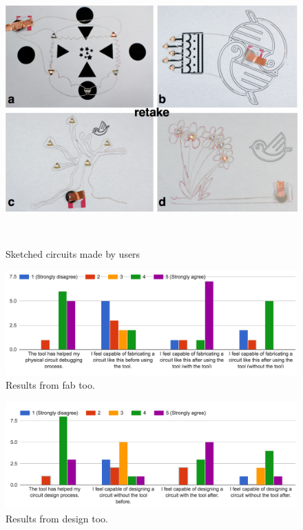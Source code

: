 \documentclass{sigchi}
\begin{document}
\begin{figure}
\centering
  \includegraphics[width=1\columnwidth]{figures/Users_artwork}
  \caption{Sketched circuits made by users}~\label{fig:user-artwork}
\end{figure}




\begin{figure}[t]
\centering
\includegraphics[width=1.0\columnwidth]{figures/fab_tool_results.png}
\caption{Results from fab too. }
\label{fig:fab_tool_results}
\end{figure}

\begin{figure}[h]
\centering
\includegraphics[width=1.0\columnwidth]{figures/design_tool_results.png}
\caption{Results from design too. }
\label{fig:design_tool_results}
\end{figure}
\end{document}
